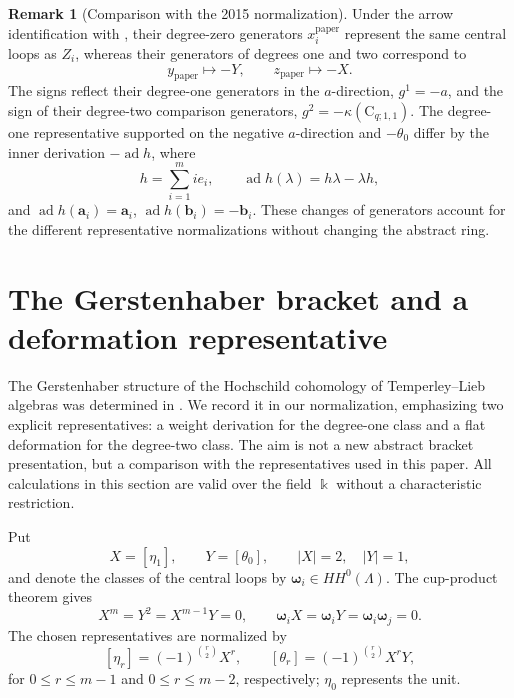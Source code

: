\documentclass[a4paper,11pt,oneside,reqno]{amsart}
\theoremstyle{definition}
\newtheorem{remark}[theorem]{Remark}
\numberwithin{equation}{section}
\begin{document}
\begin{remark}[Comparison with the 2015 normalization]
\label{cup:rem:source-normalization}
Under the arrow identification with \cite{LiXuChen}, their
degree-zero generators $x_i^{\mathrm{paper}}$ represent the same
central loops as $Z_i$, whereas their generators of degrees one
and two correspond to
\[
 y_{\mathrm{paper}}\longmapsto -Y,
 \qquad z_{\mathrm{paper}}\longmapsto -X.
\]
The signs reflect their degree-one generators in the $a$-direction,
$g^1=-a$, and the sign of their degree-two comparison generators,
$g^2=-\kappa(\mathrm C_{q;1,1})$. The degree-one representative
supported on the negative $a$-direction and $-\theta_0$ differ by the
inner derivation $-\operatorname{ad}h$, where
\[
 h=\sum_{i=1}^m i e_i,
 \qquad \operatorname{ad}h(\lambda)=h\lambda-\lambda h,
\]
and $\operatorname{ad}h(\mathbf a_i)=\mathbf a_i$,
$\operatorname{ad}h(\mathbf b_i)=-\mathbf b_i$.
These changes of generators account for the different representative
normalizations without changing the abstract ring.
\end{remark}

\section{The Gerstenhaber bracket and a deformation representative}
\label{gerst:section}

The Gerstenhaber structure of the Hochschild cohomology of
Temperley--Lieb algebras was determined in \cite{LyuWu}.  We record it
in our normalization, emphasizing two explicit representatives: a
weight derivation for the degree-one class and a flat deformation for
the degree-two class.  The aim is not a new abstract bracket
presentation, but a comparison with the representatives used in this
paper.  All calculations in this section are valid over the field
$\Bbbk$ without a characteristic restriction.

Put
\[
 X=[\eta_1],\qquad Y=[\theta_0],\qquad |X|=2,\quad |Y|=1,
\]
and denote the classes of the central loops by
$\boldsymbol\omega_i\in HH^0(\Lambda)$.  The cup-product theorem gives
\begin{equation}\label{gerst:ring-relations}
 X^m=Y^2=X^{m-1}Y=0,\qquad
 \boldsymbol\omega_iX=\boldsymbol\omega_iY
 =\boldsymbol\omega_i\boldsymbol\omega_j=0.
\end{equation}
The chosen representatives are normalized by
\begin{equation}\label{gerst:basis-conversion}
 [\eta_r]=(-1)^{\binom r2}X^r,\qquad
 [\theta_r]=(-1)^{\binom r2}X^rY,
\end{equation}
for $0\le r\le m-1$ and $0\le r\le m-2$, respectively;
$\eta_0$ represents the unit.
\end{document}
